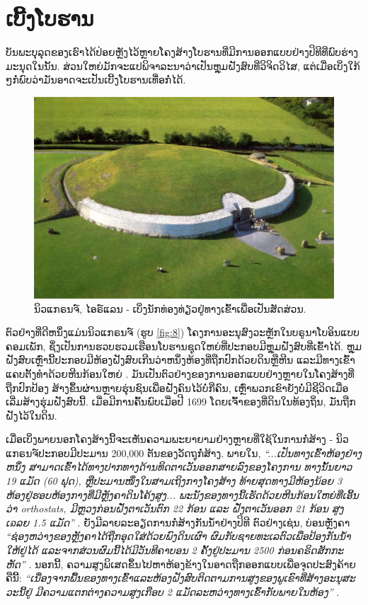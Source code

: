 \documentclass[10pt,twocolumn,letterpaper]{article}
\begin{document}
\section{ເບີ້ງໂບຮານ}

ບັນພະບຸລຸດຂອງເຮົາໄດ້ປ່ອຍຫຼັງໄວ້ຫຼາຍໂຄງສ້າງໂບຮານທີ່ມີການອອກແບບຢ່າງປິທີທີ່ພົບຮ່າງມະນຸດໃນນັ້ນ. ສ່ວນໃຫຍ່ມັກຈະແປພິຈາລະນາວ່າເປັນຫຼຸມຝັງສົບທີ່ວິຈິດວິໄສ, ແຕ່ເມື່ອເບິ່ງໃກ້ໆກໍ່ພົບວ່າມັນອາດຈະເປັນເບີ້ງໂບຮານເທື່ອກໍ່ໄດ້.

\begin{figure}[b]
\begin{center}
   \includegraphics[width=1\linewidth]{ww19.jpg}
\end{center}
   \caption{ນິວແກຣນຈ໌, ໄອຣ໌ແລນ - ເບິ່ງນັກທ່ອງທ່ຽວຢູ່ທາງເຂົ້າເພື່ອເປັນສັດສ່ວນ.}
\label{fig:8}
\label{fig:onecol}
\end{figure}

ຕົວຢ່າງທີ່ດີຫນຶ່ງແມ່ນນິວແກຣນຈ໌ (ຮູບ \ref{fig:8}) ໂຄງການອະນຸສົງວະຫຼັກໃນບຣູນາໂບອິນແບບຄອມເພັກ, ຊຶ່ງເປັນການຮວບຮວມເຮືອນໂບຮານຊຸດໃຫຍ່ທີ່ປະກອບມີຫຼຸມຝັງສົບທີ່ເຂົ້າໄດ້. ຫຼຸມຝັງສົບເຫຼົ່ານີ້ປະກອບມີຫ້ອງຝັງສົບເກີນວ່າຫນຶ່ງຫ້ອງທີ່ຖືກປົກດ້ວຍດິນຫຼືຫີນ ແລະມີທາງເຂົ້າແຄບຕັ້ງທໍາດ້ວຍຫີນກ້ອນໃຫຍ່ \cite{70}. ມັນເປັນຕົວຢ່າງຂອງການອອກແບບຢ່າງຫຼາຍໃນໂຄງສ້າງທີ່ຖືກປົກປ້ອງ ສ້າງຂຶ້ນຜ່ານຫຼາຍຮຸ່ນຊົນເພື່ອຝັງຄົນໄວ້ບໍ່ກີ່ຄົນ, ເຫຼົ່າພວກເຂົາຍັງບໍ່ມີຊີວິດເມື່ອເລີ່ມສ້າງຮຸ່ມຝັງສົບນີ້. ເມື່ອມີການຄົ້ນພົບເມື່ອປີ 1699 ໂດຍເຈົ້າຂອງທີ່ດິນໃນທ້ອງຖິ່ນ, ມັນຖືກຝັງໄວ້ໃນດິນ.

ເມື່ອເບິ່ງພາຍນອກໂຄງສ້າງນີ້ຈະເຫັນຄວາມພະຍາຍາມຢ່າງຫຼາຍທີ່ໃຊ້ໃນການກໍ່ສ້າງ - ນິວແກຣນຈ໌ປະກອບມີປະມານ 200,000 ຕັນຂອງວັດຖຸກໍ່ສ້າງ. ພາຍໃນ, \textit{“...ເປັນທາງເຂົ້າຫ້ອງຢ່າງຫນຶ່ງ ສາມາດເຂົ້າໄດ້ທາງປາກທາງດ້ານທິດຕາເວັນອອກສາຍລົງຂອງໂຄງການ ທາງນັ້ນຍາວ 19 ແມັດ (60 ຟຸດ), ຫຼືປະມານໜຶ່ງໃນສາມເຖິງກາງໂຄງສ້າງ ທ້າຍສຸດທາງມີຫ້ອງນ້ອຍ 3 ຫ້ອງຢູ່ຮອບຫ້ອງກາງທີ່ມີຫຼັງຄາດິນໂຄ້ງສູງ... ພະນັງຂອງທາງນີ້ເຮັດດ້ວຍຫີນກ້ອນໃຫຍ່ທີ່ເອີ້ນວ່າ orthostats, ມີຫຼວງກ່ອນຝັ່ງຕາເວັນຕົກ 22 ກ້ອນ ແລະ ຝັ່ງຕາເວັນອອກ 21 ກ້ອນ ສູງເຉລຍ 1.5 ແມັດ”} \cite{70}. ຍັງມີລາຍລະອຽດການກໍ່ສ້າງກັນນໍ້າຢ່າງປິທີ ຕົວຢ່າງເຊ່ນ, ບ່ອນຫຼັງຄາ \textit{“ຊ່ອງຫວ່າງຂອງຫຼັງຄາໄດ້ຖືກອຸດໃສ່ດ້ວຍພົງດິນເຜົາ ຜົມກັບຊາຍທະເລຕົວເພື່ອປ້ອງກັນນໍ້າໃຫ້ຢູ່ໄດ້ ແລະຈາກສ່ວນຜົມນີ້ໄດ້ມີວັນທີຄາບອນ 2 ຄັ້ງຢູ່ປະມານ 2500 ກ່ອນຄຣິດສັກກະຫັດ”} \cite{71}. ນອກນີ້, ຄວາມສູງພິເສດຂຶ້ນໄປຫາຫ້ອງຂ້າງໃນອາດຖືກອອກແບບເພື່ອຈຸດປະສົງຄ້າຍຄືນີ້: \textit{“ເນື່ອງຈາກພື້ນຂອງທາງເຂົ້າແລະຫ້ອງຝັງສົບຕິດຕາມການສູງຂອງພູເຂົາທີ່ສ້າງອະນຸສະວະນີ້ຢູ່ ມີຄວາມແຕກຕ່າງຄວາມສູງເກືອບ 2 ແມັດລະຫວ່າງທາງເຂົ້າກັບພາຍໃນຫ້ອງ”} \cite{71}.
\end{document}

